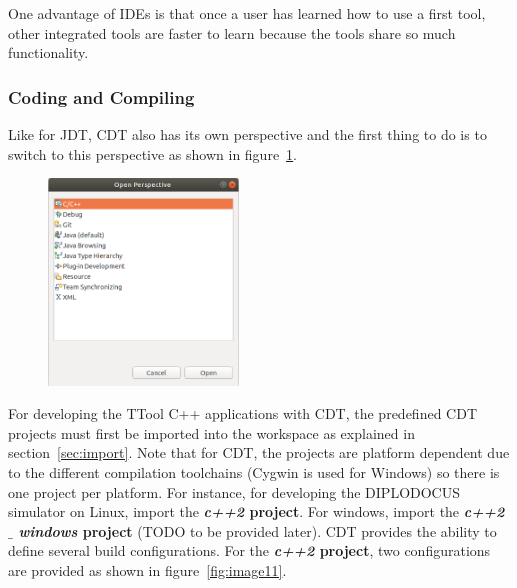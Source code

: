 \documentclass[12pt]{article}
\begin{document}
One advantage of IDEs is that once a user has learned how to use a first tool,
other integrated tools are faster to learn because the tools share so much
functionality.

\subsubsection{Coding and Compiling}

Like for JDT, CDT also has its own perspective and the first thing to do is to
switch to this perspective as shown in figure~\ref{fig:image10}.

\begin{figure}[H]
\begin{center}
\includegraphics[width=0.45\textwidth]{images/image11.png}
\end{center}
\caption{}
\label{fig:image10}
\end{figure}

For developing the TTool C++ applications with CDT, the predefined CDT projects
must first be imported into the workspace as explained in
section~\ref{sec:import}. Note that for CDT, the projects are platform dependent
due to the different compilation toolchains (Cygwin is used for Windows) so there is one project per
platform. For instance, for developing the DIPLODOCUS simulator on Linux, import
the \textbf{\textit{c++2} project}. For windows, import the
\textbf{\textit{c++2 $  \_  $ windows} project} (TODO to be provided later). CDT
provides the ability to define several build configurations. For the
\textbf{\textit{c++2} project}, two configurations are provided as shown in
figure~\ref{fig:image11}.
\end{document}
